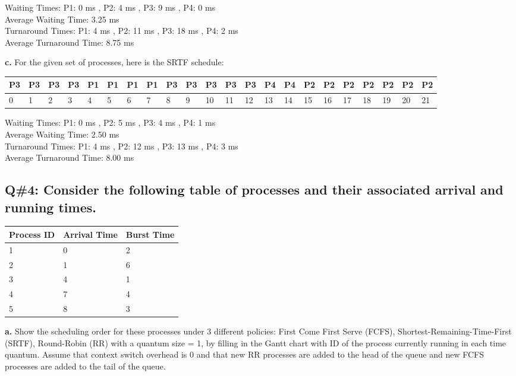 Waiting Times: P1: 0 ms , P2: 4 ms , P3: 9 ms , P4: 0 ms  \\
Average Waiting Time: 3.25 ms  \\
Turnaround Times: P1: 4 ms , P2: 11 ms , P3: 18 ms , P4: 2 ms  \\
Average Turnaround Time: 8.75 ms

\textbf{c.} For the given set of processes, here is the SRTF schedule:

\begin{table}[htbp]
\begin{tabularx}{\textwidth}{| X | X | X | X | X | X | X | X | X | X | X | X | X | X | X | X | X | X |X | X | X | X |}
\hline
P3 & P3 & P3 & P3 & P1 & P1 & P1 & P1 & P3 & P3 & P3 & P3 & P3 & P4 & P4 & P2 & P2 & P2 & P2 & P2 & P2 & P2\\
\hline
0 & 1 & 2 & 3 & 4 & 5 & 6 & 7 & 8 & 9 &10 &11 &12 &13 &14 &15 &16 &17 &18 &19 &20 &21\\
\hline
\end{tabularx}
\end{table}

Waiting Times: P1: 0 ms , P2: 5 ms , P3: 4 ms , P4: 1 ms  \\
Average Waiting Time: 2.50 ms  \\
Turnaround Times: P1: 4 ms , P2: 12 ms , P3: 13 ms , P4: 3 ms  \\
Average Turnaround Time: 8.00 ms

\subsection*{Q\#4: Consider the following table of processes and their associated arrival and running times.}

\begin{table}[htbp]
\begin{tabularx}{\textwidth}{| X | X | X |}
\hline
\textbf{Process ID} & \textbf{Arrival Time} & \textbf{Burst Time} \\
\hline
1 & 0 & 2 \\
\hline
2 & 1 & 6 \\
\hline
3 & 4 & 1 \\
\hline
4 & 7 & 4 \\
\hline
5 & 8 & 3 \\
\hline
\end{tabularx}
\end{table}

\textbf{a.} Show the scheduling order for these processes under 3 different policies: First Come First Serve  
(FCFS), Shortest-Remaining-Time-First (SRTF), Round-Robin (RR) with a quantum size = 1, by  
filling in the Gantt chart with ID of the process currently running in each time quantum. Assume  
that context switch overhead is 0 and that new RR processes are added to the head of the queue and  
new FCFS processes are added to the tail of the queue.\\

